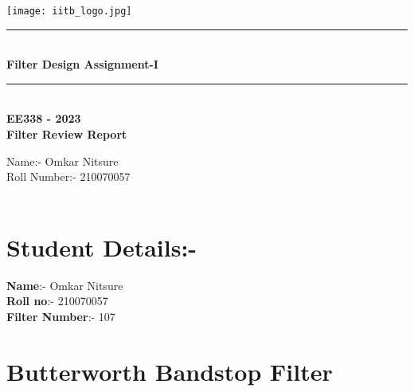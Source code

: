 \documentclass[12pt]{article}
\begin{document}
\begin{titlepage}
\begin{center}
    \vspace*{\fill}
\texttt{[image: iitb\_logo.jpg]}\\
[4 cm]
    \rule{12.5cm}{0.75mm}\\
    \huge{\bfseries Filter Design Assignment-I}
    \rule{12.5cm}{0.75mm}\\
    [0.5cm]
   {\textbf {EE338 - 2023 \\
    Filter Review Report}}\\
    [2.5cm]
\end{center}
\begin{flushleft}
   {\huge
    Name:- Omkar Nitsure \\
    Roll Number:- 210070057 \\
     \\}
    \end{flushleft}
\end{titlepage}
\tableofcontents





\pagestyle{fancy}
\fancyhead{} %
\fancyfoot{} %
\fancyfoot[C]{\thepage}
\newpage
\section{Student Details:-}
\textbf{Name}:- Omkar Nitsure\\
\textbf{Roll no}:- 210070057\\
\textbf{Filter Number}:- 107\\

\section{Butterworth Bandstop Filter}
\end{document}
